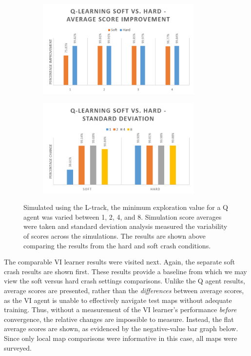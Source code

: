 \documentclass[12pt, letter]{article}
\begin{document}
\begin{figure}[h] 
    \centering
    \begin{subfigure}[b]{0.48\textwidth}
        \includegraphics[width=0.9\textwidth]{img/softVhard/Q/AvgScore}
    \end{subfigure}
    \begin{subfigure}[b]{0.48\textwidth}
        \includegraphics[width=0.9\textwidth]{img/softVhard/Q/StDev}
    \end{subfigure}
    \caption{Simulated using the L-track, the minimum exploration value for a Q agent was varied between 1, 2, 4, and 8. Simulation score averages were taken and standard deviation analysis measured the variability of scores across the simulations. The results are shown above comparing the results from the hard and soft crash conditions.}
    \label{fig:svhQAvgScoreStDev}
\end{figure}

The comparable VI learner results were visited next.  Again, the separate soft crash results are shown first.  These results provide a baseline from which we may view the soft versus hard crash settings comparisons.  Unlike the Q agent results, average scores are presented, rather than the \emph{differences} between average scores, as the VI agent is unable to effectively navigate test maps without adequate training.  Thus, without a measurement of the VI learner's performance \emph{before} convergence, the relative changes are impossible to measure.  Instead, the flat average scores are shown, as evidenced by the negative-value bar graph below.  Since only local map comparisons were informative in this case, all maps were surveyed.
\end{document}
